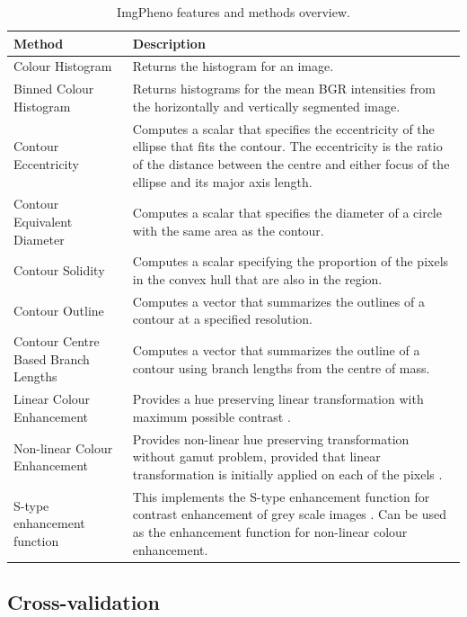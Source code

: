 \documentclass[twocolumn]{bmcart}
\begin{document}
\begin{table}[h]\footnotesize
    \caption{ImgPheno features and methods overview.}
    \begin{center}
    \begin{tabular}{p{3.5cm}p{3.5cm}}
    \toprule
    \textbf{Method} & \textbf{Description} \\
    \midrule
    Colour Histogram & Returns the histogram for an image. \\
    Binned Colour Histogram & Returns histograms for the mean BGR intensities from the horizontally and vertically segmented image. \\
    Contour Eccentricity & Computes a scalar that specifies the eccentricity of the ellipse that fits the contour. The eccentricity is the ratio of the distance between the centre and either focus of the ellipse and its major axis length. \\
    Contour Equivalent Diameter & Computes a scalar that specifies the diameter of a circle with the same area as the contour. \\
    Contour Solidity & Computes a scalar specifying the proportion of the pixels in the convex hull that are also in the region. \\
    Contour Outline & Computes a vector that summarizes the outlines of a contour at a specified resolution. \\
    Contour Centre Based Branch Lengths & Computes a vector that summarizes the outline of a contour using branch lengths from the centre of mass. \\
    \midrule
    Linear Colour Enhancement & Provides a hue preserving linear transformation with maximum possible contrast \cite{Naik2003}. \\
    Non-linear Colour Enhancement & Provides non-linear hue preserving transformation without gamut problem, provided that linear transformation is initially applied on each of the pixels \cite{Naik2003}. \\
    S-type enhancement function & This implements the S-type enhancement function for contrast enhancement of grey scale images \cite{Naik2003}. Can be used as the enhancement function for non-linear colour enhancement. \\
    \bottomrule
    \end{tabular}
    \end{center}
    \label{tbl:imgpheno-methods}
\end{table}

\subsection{Cross-validation}
\end{document}
